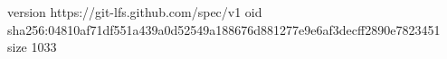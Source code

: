 version https://git-lfs.github.com/spec/v1
oid sha256:04810af71df551a439a0d52549a188676d881277e9e6af3decff2890e7823451
size 1033
